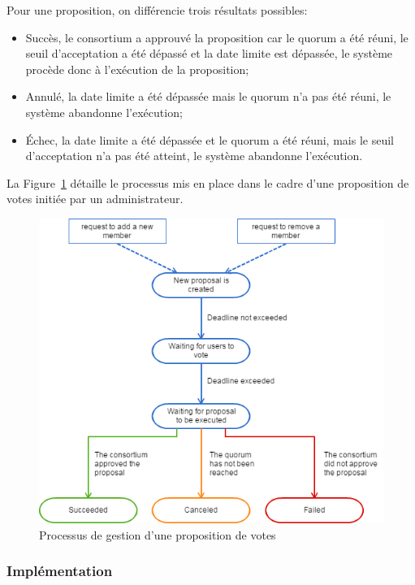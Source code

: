 \documentclass{tnreport}
\begin{document}
Pour une proposition, on différencie trois résultats possibles:
\begin{itemize}
	\item Succès, le consortium a approuvé la proposition car le quorum a été réuni, le seuil d'acceptation a été dépassé et la date limite est dépassée, le système procède donc à l'exécution de la proposition;
	\item Annulé, la date limite a été dépassée mais le quorum n'a pas été réuni, le système abandonne l'exécution;
	\item Échec, la date limite a été dépassée et le quorum a été réuni, mais le seuil d'acceptation n'a pas été atteint, le système abandonne l'exécution.
	\newline
\end{itemize}

La Figure~\ref{fig:user-flow} détaille le processus mis en place dans le cadre d'une proposition de votes initiée par un administrateur.

\begin{figure}[h]
	\centering
	\includegraphics[scale=0.7]{figures/user-management-flow}
	\caption{Processus de gestion d'une proposition de votes}
	\label{fig:user-flow}
\end{figure}

\subsubsection{Implémentation}
\end{document}
